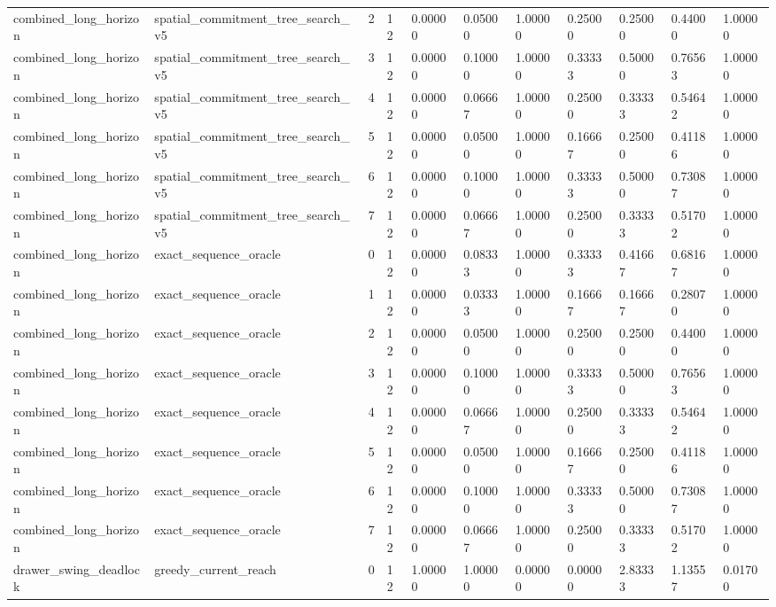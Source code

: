 \documentclass{article}
\begin{document}
\begin{table}[tbp]
{\begin{tabular}{lllllllllll}
combined\_long\_horizon & spatial\_commitment\_tree\_search\_v5 & 2 & 12 & 0.00000 & 0.05000 & 1.00000 & 0.25000 & 0.25000 & 0.44000 & 1.00000 \\
combined\_long\_horizon & spatial\_commitment\_tree\_search\_v5 & 3 & 12 & 0.00000 & 0.10000 & 1.00000 & 0.33333 & 0.50000 & 0.76563 & 1.00000 \\
combined\_long\_horizon & spatial\_commitment\_tree\_search\_v5 & 4 & 12 & 0.00000 & 0.06667 & 1.00000 & 0.25000 & 0.33333 & 0.54642 & 1.00000 \\
combined\_long\_horizon & spatial\_commitment\_tree\_search\_v5 & 5 & 12 & 0.00000 & 0.05000 & 1.00000 & 0.16667 & 0.25000 & 0.41186 & 1.00000 \\
combined\_long\_horizon & spatial\_commitment\_tree\_search\_v5 & 6 & 12 & 0.00000 & 0.10000 & 1.00000 & 0.33333 & 0.50000 & 0.73087 & 1.00000 \\
combined\_long\_horizon & spatial\_commitment\_tree\_search\_v5 & 7 & 12 & 0.00000 & 0.06667 & 1.00000 & 0.25000 & 0.33333 & 0.51702 & 1.00000 \\
combined\_long\_horizon & exact\_sequence\_oracle & 0 & 12 & 0.00000 & 0.08333 & 1.00000 & 0.33333 & 0.41667 & 0.68167 & 1.00000 \\
combined\_long\_horizon & exact\_sequence\_oracle & 1 & 12 & 0.00000 & 0.03333 & 1.00000 & 0.16667 & 0.16667 & 0.28070 & 1.00000 \\
combined\_long\_horizon & exact\_sequence\_oracle & 2 & 12 & 0.00000 & 0.05000 & 1.00000 & 0.25000 & 0.25000 & 0.44000 & 1.00000 \\
combined\_long\_horizon & exact\_sequence\_oracle & 3 & 12 & 0.00000 & 0.10000 & 1.00000 & 0.33333 & 0.50000 & 0.76563 & 1.00000 \\
combined\_long\_horizon & exact\_sequence\_oracle & 4 & 12 & 0.00000 & 0.06667 & 1.00000 & 0.25000 & 0.33333 & 0.54642 & 1.00000 \\
combined\_long\_horizon & exact\_sequence\_oracle & 5 & 12 & 0.00000 & 0.05000 & 1.00000 & 0.16667 & 0.25000 & 0.41186 & 1.00000 \\
combined\_long\_horizon & exact\_sequence\_oracle & 6 & 12 & 0.00000 & 0.10000 & 1.00000 & 0.33333 & 0.50000 & 0.73087 & 1.00000 \\
combined\_long\_horizon & exact\_sequence\_oracle & 7 & 12 & 0.00000 & 0.06667 & 1.00000 & 0.25000 & 0.33333 & 0.51702 & 1.00000 \\
drawer\_swing\_deadlock & greedy\_current\_reach & 0 & 12 & 1.00000 & 1.00000 & 0.00000 & 0.00000 & 2.83333 & 1.13557 & 0.01700 \\

\end{tabular}}
\end{table}
\end{document}

